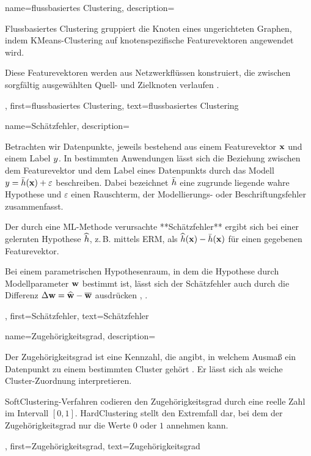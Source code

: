 {{{{
{
	name={flussbasiertes Clustering},
	description={
		Flussbasiertes \gls{Clustering} gruppiert die Knoten eines 
		ungerichteten \gls{Graphen}, indem \gls{KMeans}-\gls{Clustering} auf knotenspezifische 
		\gls{Featurevektoren} angewendet wird. 
		
		Diese \gls{Featurevektoren} werden aus Netzwerkflüssen konstruiert, die zwischen sorgfältig 
		ausgewählten Quell- und Zielknoten verlaufen \cite{FlowSpecClustering2021}.
	},
	first={flussbasiertes Clustering},
	text={flussbasiertes Clustering}
}

{
	name={Schätzfehler},
	description={
		Betrachten wir \gls{Datenpunkte}, jeweils bestehend aus einem \gls{Featurevektor} ${\bf x}$ und einem \gls{Label} $y$. 
		In bestimmten Anwendungen lässt sich die Beziehung zwischen dem \gls{Featurevektor} und dem \gls{Label} 
		eines \gls{Datenpunkts} durch das Modell $y = \bar{h}({\bf x}) + \varepsilon$ beschreiben. 
		Dabei bezeichnet $\bar{h}$ eine zugrunde liegende wahre \gls{Hypothese} und $\varepsilon$ 
		einen Rauschterm, der Modellierungs- oder Beschriftungsfehler zusammenfasst. 
		
		Der durch eine \gls{ML}-Methode verursachte **Schätzfehler** ergibt sich bei einer gelernten \gls{Hypothese} 
		$\widehat{h}$, z.\,B. mittels \gls{ERM}, als 
		$\widehat{h}({\bf x}) - \bar{h}({\bf x})$ für einen gegebenen \gls{Featurevektor}. 
		
		Bei einem parametrischen \gls{Hypothesenraum}, in dem die \gls{Hypothese} durch \gls{Modellparameter} ${\bf w}$ 
		bestimmt ist, lässt sich der Schätzfehler auch durch die Differenz $\Delta {\bf w} = \widehat{{\bf w}} - \overline{{\bf w}}$ 
		ausdrücken \cite{kay}, \cite{hastie01statisticallearning}.
	},
	first={Schätzfehler},
	text={Schätzfehler}
}

{
	name={Zugehörigkeitsgrad},
	description={
		Der Zugehörigkeitsgrad ist eine Kennzahl, die angibt, in welchem Ausmaß ein \gls{Datenpunkt} 
		zu einem bestimmten \gls{Cluster} gehört \cite[Kap.~8]{MLBasics}. Er lässt sich als weiche \gls{Cluster}-Zuordnung interpretieren. 
		
		\Gls{SoftClustering}-Verfahren codieren den Zugehörigkeitsgrad durch eine reelle Zahl im Intervall $[0,1]$. 
		\Gls{HardClustering} stellt den Extremfall dar, bei dem der Zugehörigkeitsgrad nur die Werte $0$ oder $1$ annehmen kann.
	},
	first={Zugehörigkeitsgrad},
	text={Zugehörigkeitsgrad}
}

}}}}
